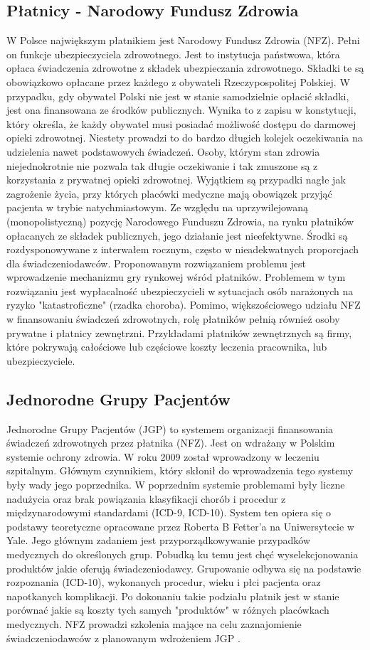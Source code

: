 \subsection{Płatnicy - Narodowy Fundusz Zdrowia}
\label{subsec:platnik}
W Polsce największym płatnikiem jest Narodowy Fundusz Zdrowia (NFZ). Pełni on funkcje ubezpieczyciela zdrowotnego. Jest to instytucja państwowa, która opłaca świadczenia zdrowotne z składek ubezpieczania zdrowotnego. Składki te są obowiązkowo opłacane przez każdego z obywateli Rzeczypospolitej Polskiej. W przypadku, gdy obywatel Polski nie jest w stanie samodzielnie opłacić składki, jest ona finansowana ze środków publicznych. Wynika to z zapisu w konstytucji, który określa, że każdy obywatel musi posiadać możliwość dostępu do darmowej opieki zdrowotnej. Niestety prowadzi to do bardzo długich kolejek oczekiwania na udzielenia nawet podstawowych świadczeń. Osoby, którym stan zdrowia niejednokrotnie nie pozwala tak długie oczekiwanie i tak zmuszone są z korzystania z prywatnej opieki zdrowotnej. Wyjątkiem są przypadki nagłe jak zagrożenie życia, przy których placówki medyczne mają obowiązek przyjąć pacjenta w trybie natychmiastowym. 
Ze względu na uprzywilejowaną (monopolistyczną) pozycję Narodowego Funduszu Zdrowia, na rynku płatników opłacanych ze składek publicznych, jego działanie jest nieefektywne. Środki są rozdysponowywane z interwałem rocznym, często w nieadekwatnych proporcjach dla świadczeniodawców. Proponowanym rozwiązaniem problemu jest wprowadzenie mechanizmu gry rynkowej wśród płatników. Problemem w tym rozwiązaniu jest wypłacalność ubezpieczycieli w sytuacjach osób narażonych na ryzyko "katastroficzne" (rzadka choroba).
Pomimo, większościowego udziału NFZ w finansowaniu świadczeń zdrowotnych, rolę płatników pełnią również osoby prywatne i płatnicy zewnętrzni.
Przykładami płatników zewnętrznych są firmy, które pokrywają całościowe lub częściowe koszty leczenia pracownika, lub ubezpieczyciele.

\subsection{Jednorodne Grupy Pacjentów}
Jednorodne Grupy Pacjentów (JGP) to systemem organizacji finansowania świadczeń zdrowotnych przez płatnika (NFZ). Jest on wdrażany w Polskim systemie ochrony zdrowia. W roku 2009 został wprowadzony w leczeniu szpitalnym.  Głównym czynnikiem, który skłonił do wprowadzenia tego systemy były wady jego poprzednika. W poprzednim systemie problemami były liczne nadużycia oraz brak powiązania klasyfikacji chorób i procedur z międzynarodowymi standardami (ICD-9, ICD-10).
System ten opiera się o podstawy teoretyczne opracowane przez Roberta B Fetter'a na Uniwersytecie w Yale. Jego głównym zadaniem jest przyporządkowywanie przypadków medycznych do określonych grup. Pobudką ku temu jest chęć wyselekcjonowania produktów jakie oferują świadczeniodawcy.
Grupowanie odbywa się na podstawie rozpoznania (ICD-10), wykonanych procedur, wieku i płci pacjenta oraz napotkanych komplikacji. Po dokonaniu takie podziału płatnik jest w stanie porównać jakie są koszty tych samych "produktów" w różnych placówkach medycznych.
NFZ prowadzi szkolenia mające na celu zaznajomienie świadczeniodawców z planowanym wdrożeniem JGP \cite{nfz:jgp:online}.

